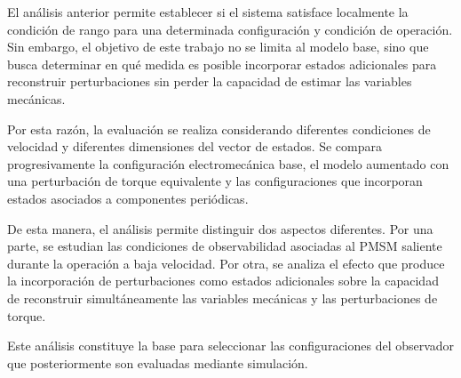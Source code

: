 El análisis anterior permite establecer si el sistema satisface localmente la
condición de rango para una determinada configuración y condición de operación.
Sin embargo, el objetivo de este trabajo no se limita al modelo base, sino que
busca determinar en qué medida es posible incorporar estados adicionales para
reconstruir perturbaciones sin perder la capacidad de estimar las variables
mecánicas.

Por esta razón, la evaluación se realiza considerando diferentes condiciones de
velocidad y diferentes dimensiones del vector de estados. Se compara
progresivamente la configuración electromecánica base, el modelo aumentado con
una perturbación de torque equivalente y las configuraciones que incorporan
estados asociados a componentes periódicas.

De esta manera, el análisis permite distinguir dos aspectos diferentes. Por una
parte, se estudian las condiciones de observabilidad asociadas al PMSM saliente
durante la operación a baja velocidad. Por otra, se analiza el efecto que produce
la incorporación de perturbaciones como estados adicionales sobre la capacidad
de reconstruir simultáneamente las variables mecánicas y las perturbaciones de
torque.

Este análisis constituye la base para seleccionar las configuraciones del
observador que posteriormente son evaluadas mediante simulación.


